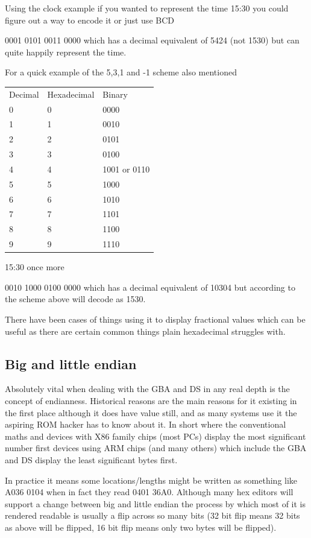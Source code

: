 \documentclass[
]{book}
\begin{document}
Using the clock example if you wanted to represent the time 15:30 you could figure out a way to encode it or just use BCD

0001 0101 0011 0000 which has a decimal equivalent of 5424 (not 1530) but can quite happily represent the time.

For a quick example of the 5,3,1 and -1 scheme also mentioned

\begin{longtable}[]{@{}lll@{}}
\toprule()
\endhead
Decimal & Hexadecimal & Binary \\
0 & 0 & 0000 \\
1 & 1 & 0010 \\
2 & 2 & 0101 \\
3 & 3 & 0100 \\
4 & 4 & 1001 or 0110 \\
5 & 5 & 1000 \\
6 & 6 & 1010 \\
7 & 7 & 1101 \\
8 & 8 & 1100 \\
9 & 9 & 1110 \\
\bottomrule()
\end{longtable}

15:30 once more

0010 1000 0100 0000 which has a decimal equivalent of 10304 but according to the scheme above will decode as 1530.

There have been cases of things using it to display fractional values which can be useful as there are certain common things plain hexadecimal struggles with.

\hypertarget{big-and-little-endian}{%
\subsection{Big and little endian}\label{big-and-little-endian}}

Absolutely vital when dealing with the GBA and DS in any real depth is the concept of endianness. Historical reasons are the main reasons for it existing in the first place although it does have value still, and as many systems use it the aspiring ROM hacker has to know about it. In short where the conventional maths and devices with X86 family chips (most PCs) display the most significant number first devices using ARM chips (and many others) which include the GBA and DS display the least significant bytes first.

In practice it means some locations/lengths might be written as something like A036 0104 when in fact they read 0401 36A0. Although many hex editors will support a change between big and little endian the process by which most of it is rendered readable is usually a flip across so many bits (32 bit flip means 32 bits as above will be flipped, 16 bit flip means only two bytes will be flipped).
\end{document}
